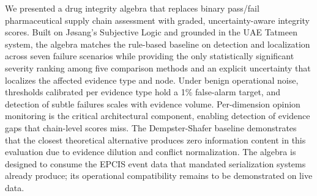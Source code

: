 \documentclass[conference]{IEEEtran}
\begin{document}
We presented a drug integrity algebra that replaces binary pass/fail
pharmaceutical supply chain assessment with graded, uncertainty-aware
integrity scores. Built on J\o sang's Subjective Logic and grounded in
the UAE Tatmeen system, the algebra matches the rule-based baseline on
detection and localization across seven failure scenarios while
providing the only statistically significant severity ranking among five
comparison methods and an explicit uncertainty that localizes the
affected evidence type and node. Under benign operational noise,
thresholds calibrated per evidence type hold a 1\% false-alarm target,
and detection of subtle failures scales with evidence volume.
Per-dimension opinion monitoring is the critical architectural
component, enabling detection of evidence gaps that chain-level scores
miss. The Dempster-Shafer baseline demonstrates that the closest
theoretical alternative produces zero information content in this
evaluation due to evidence dilution and conflict normalization. The
algebra is designed to consume the EPCIS event data that mandated
serialization systems already produce; its operational compatibility
remains to be demonstrated on live data.




\end{document}
